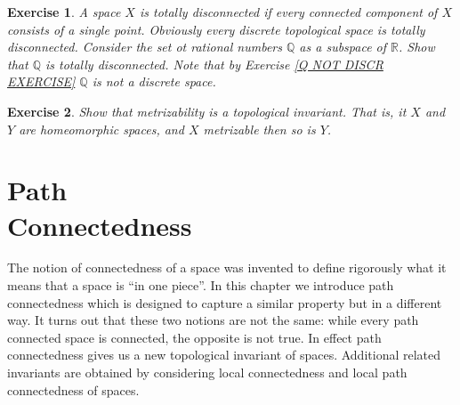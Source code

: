 \documentclass[11pt, letterpaper, oneside]{report}
\theoremstyle{pplain}
\newtheorem{ITERMVALUE THM}[theorem]{Intermediate Value Theorem}
\newtheorem{HEINEBOREL THM}[theorem]{Heine-Borel Theorem}
\newtheorem{UMETR THM}[theorem]{Urysohn Metrization Theorem}
\newtheorem{UMETR2 THM}[theorem]{Urysohn Metrization Theorem (v.2)}
\theoremstyle{ddefinition}
\theoremstyle{nnn}
\newtheorem{TDA NN}[theorem]{Topological Data Analysis. }
\theoremstyle{eexercise}
\newtheorem{exercise}{Exercise}[chapter]
\newcommand{\Q}{{\mathbb Q}}
\newcommand{\R}{{\mathbb R}}
\begin{document}
\begin{exercise}
\label{Q TOTALY DISCONNECT EXERCISE}
A space $X$ is \emph{totally disconnected} if every connected component of $X$ consists of a single 
point. Obviously every discrete topological space is totally disconnected. Consider the set ot rational numbers 
$\Q$ as a subspace of $\R$. Show that $\Q$ is totally disconnected. Note that  by Exercise 
\ref{Q NOT DISCR EXERCISE} $\Q$ is not a discrete space.  
\end{exercise}






\begin{exercise}
Show that metrizability is a topological invariant. That is, it $X$ and $Y$ are homeomorphic spaces, and
$X$ metrizable then so is $Y$.   
\end{exercise} 





\newpage

\chapter[Path Connectedness]{Path \\ Connectedness}


The notion of connectedness of a space was invented to define rigorously what 
it means that a space is ``in one piece''. In this chapter we introduce path connectedness 
which is designed to capture a similar property but in a different way. It turns out that these 
two notions are not the same: while every path connected space is connected, the opposite 
is not true. In effect path connectedness gives us a new topological invariant of spaces. 
Additional related invariants are obtained by considering local connectedness and local path 
connectedness of spaces. 

\thispagestyle{firststyle}
\end{document}

